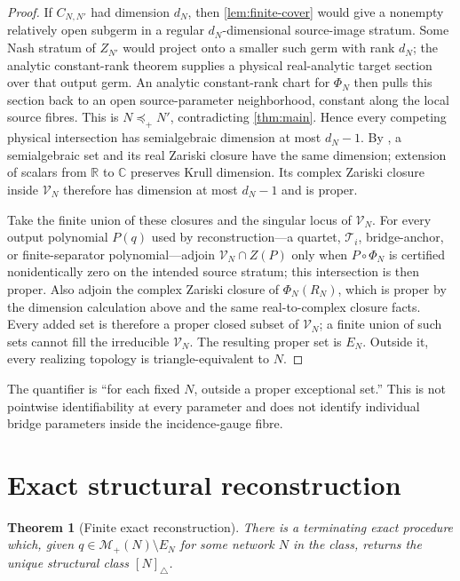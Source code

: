 \documentclass[11pt]{article}
\newtheorem{theorem}{Theorem}[section]
\theoremstyle{remark}
\newcommand{\R}{\mathbb R}
\newcommand{\C}{\mathbb C}
\newcommand{\M}{\mathcal M}
\newcommand{\V}{\mathcal V}
\newcommand{\preceqplus}{\preceq_+}
\newcommand{\1}{\mathbf 1}
\begin{document}
\begin{proof}
If \(C_{N,N'}\) had dimension \(d_N\), then
\cref{lem:finite-cover} would give a nonempty relatively open subgerm in a
regular \(d_N\)-dimensional source-image stratum.  Some Nash stratum of
\(Z_{N'}\) would project onto a smaller such germ with rank \(d_N\); the
analytic constant-rank theorem supplies a physical real-analytic target
section over that output germ.  An analytic constant-rank chart for
\(\Phi_N\) then pulls this section back to an open source-parameter
neighborhood, constant along the local source fibres.  This is
\(N\preceqplus N'\), contradicting
\cref{thm:main}.  Hence every competing physical intersection has
semialgebraic dimension at most \(d_N-1\).  By
\cite[Proposition~2.8.2]{BochnakCosteRoy1998}, a semialgebraic set and its
real Zariski closure have the same dimension; extension of scalars from
\(\R\) to \(\C\) preserves Krull dimension.  Its complex Zariski closure
inside \(\V_N\) therefore has dimension at most \(d_N-1\) and is proper.

Take the finite union of these closures and the singular locus of \(\V_N\).
For every output polynomial \(P(q)\) used by reconstruction---a quartet,
\(\mathcal T_i\), bridge-anchor, or finite-separator polynomial---adjoin
\(\V_N\cap Z(P)\) only when \(P\circ\Phi_N\) is certified
nonidentically zero on the intended source stratum; this intersection is
then proper.  Also adjoin the complex Zariski closure of \(\Phi_N(R_N)\),
which is proper by the dimension calculation above and the same
real-to-complex closure facts.  Every added set is therefore a proper closed
subset of \(\V_N\); a finite union of such
sets cannot fill the irreducible \(\V_N\).  The resulting proper set is
\(E_N\).  Outside it, every realizing topology is triangle-equivalent to
\(N\).
\end{proof}

The quantifier is ``for each fixed \(N\), outside a proper exceptional set.''
This is not pointwise identifiability at every parameter and does not identify
individual bridge parameters inside the incidence-gauge fibre.

\section{Exact structural reconstruction}\label{sec:reconstruction}

\begin{theorem}[Finite exact reconstruction]\label{thm:reconstruction}
There is a terminating exact procedure which, given
\(q\in\M_+(N)\setminus E_N\) for some network \(N\) in the class, returns the
unique structural class \([N]_\triangle\).
\end{theorem}
\end{document}
